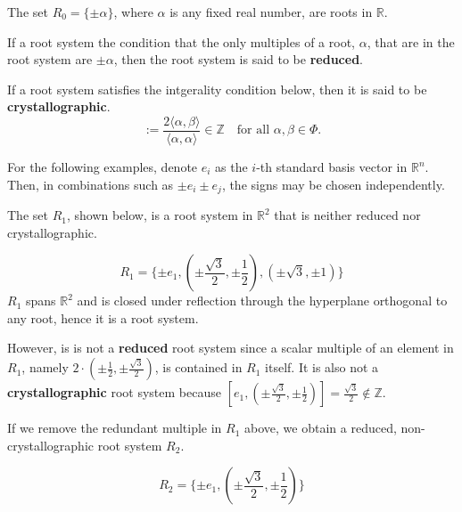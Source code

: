 \begin{example}
    The set $R_0 = \{\pm \alpha\}$, where $\alpha$ is any fixed real number, are roots in $\mathbb{R}$.
\end{example}

\begin{definition}
    If a root system the condition that the only multiples of a root, $\alpha$, that are in the root system are $\pm \alpha$, then the root system is said to be \textbf{reduced}.
\end{definition}

\begin{definition}
    If a root system satisfies the intgerality condition below, then it is said to be \textbf{crystallographic}.
    \begin{equation*}
        [ \beta, \alpha ] :=  \frac{2 \langle \alpha, \beta \rangle}{\langle \alpha, \alpha \rangle} \in \mathbb{Z} \quad \text{for all } \alpha, \beta \in \Phi.
    \end{equation*}
\end{definition}


For the following examples, denote $e_i$ as the $i$-th standard basis vector in $\mathbb{R}^n$. Then, in combinations such as $\pm e_i \pm e_j$, the signs may be chosen independently.

\begin{example}
    The set $R_1$, shown below, is a root system in $\mathbb{R}^2$ that is neither reduced nor crystallographic.
    
    \begin{equation*}
        R_1 = \{
            \pm e_1, (\pm \frac{\sqrt{3}}{2}, \pm \frac{1}{2}), (\pm \sqrt{3}, \pm 1) 
        \} 
    \end{equation*}
    $R_1$ spans $\mathbb{R}^2$ and is closed under reflection through the hyperplane orthogonal to any root, hence it is a root system.
    
    However, is is not a \textbf{reduced} root system since a scalar multiple of an element in $R_1$, namely $2 \cdot (\pm \frac{1}{2}, \pm \frac{\sqrt{3}}{2})$, is contained in $R_1$ itself. 
    It is also not a \textbf{crystallographic} root system because $ [ e_1, (\pm \frac{\sqrt{3}}{2}, \pm \frac{1}{2}) ] = \frac{\sqrt{3}}{2} \notin \mathbb{Z}$.
\end{example}

\begin{example}
    If we remove the redundant multiple in $R_1$ above, we obtain a reduced, non-crystallographic root system $R_2$.
    
    \begin{equation*}
        R_2 = \{
            \pm e_1, (\pm \frac{\sqrt{3}}{2}, \pm \frac{1}{2})
        \} 
    \end{equation*}
\end{example}


